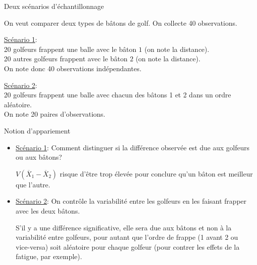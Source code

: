 \documentclass{BeamerTemplate}
\begin{document}
\begin{frame}[t]{Deux scénarios d'échantillonnage}


On veut comparer deux types de  bâtons de golf. On collecte 40 observations.



\medskip
\small

\underline{Scénario 1}:\\
20 golfeurs frappent une balle avec le bâton $1$ (on note la distance).\\%
20 \alert{autres} golfeurs frappent avec le bâton $2$ (on note la distance).\\
On note donc 40 observations indépendantes.

\medskip
\underline{Scénario 2}:\\
20 golfeurs  frappent une balle avec chacun des bâtons 1 et 2 dans un ordre aléatoire. \\
On note 20 paires d'observations.%

\medskip

\end{frame}

\begin{frame}[t]{Notion d'appariement}

\begin{itemize}
\item \underline{Scénario 1}:  %
    \alert{Comment distinguer si la différence observée est due aux golfeurs ou aux bâtons?}

\medskip
$V(\overline{X}_1-\overline{X}_2)$ risque d'être trop élevée pour  conclure qu'un bâton est meilleur que l'autre.

\medskip
\item \underline{Scénario 2}: \alert{On contrôle la variabilité entre les golfeurs} en les faisant frapper avec les deux bâtons.

\medskip
S'il y a une différence significative, elle sera due aux bâtons et non à la variabilité entre golfeurs, pour autant que l'ordre de frappe (1 avant 2 ou vice-versa) soit aléatoire pour chaque golfeur (pour contrer les effets de la fatigue, par exemple).

\medskip
{}
\end{itemize}
\end{frame}
\end{document}
